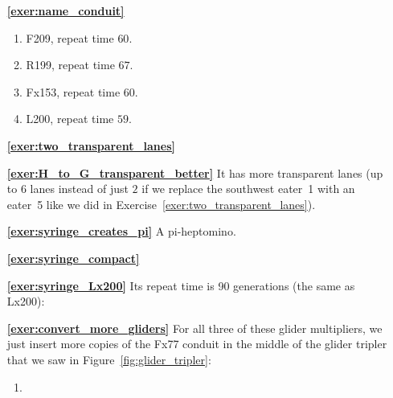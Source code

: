 \begin{multicols}{2}
	\begin{itemize}[leftmargin=0em]
		\item[\bf\color{ocre}\sffamily\ref{exer:name_conduit}] \begin{enumerate}[leftmargin=1.5em,label=\bf\color{ocre}(\alph*)]
			\item F209, repeat time $60$.
			
			\item R199, repeat time $67$.
			
			\item Fx153, repeat time $60$.
			
			\item L200, repeat time $59$.\\
		\end{enumerate}
		
		
		\item[\bf\color{ocre}\sffamily\ref{exer:two_transparent_lanes}]  \\
		
		
		\item[\bf\color{ocre}\sffamily\ref{exer:H_to_G_transparent_better}] It has more transparent lanes (up to $6$ lanes instead of just $2$ if we replace the southwest eater~1 with an eater~5 like we did in Exercise~\ref{exer:two_transparent_lanes}).\\
		
		
		\item[\bf\color{ocre}\sffamily\ref{exer:syringe_creates_pi}] A pi-heptomino. \\
		
		
		\item[\bf\color{ocre}\sffamily\ref{exer:syringe_compact}]  \\
		
		
		
		\item[\bf\color{ocre}\sffamily\ref{exer:syringe_Lx200}] Its repeat time is 90 generations (the same as Lx200):
		\begin{center}
		\end{center}
		
		
		\item[\bf\color{ocre}\sffamily\ref{exer:convert_more_gliders}] For all three of these glider multipliers, we just insert more copies of the Fx77 conduit in the middle of the glider tripler that we saw in Figure~\ref{fig:glider_tripler}:
		\begin{enumerate}[leftmargin=1.5em,label=\bf\color{ocre}(\alph*)]
			\item {} \\
			

\end{enumerate}
\end{itemize}
\end{multicols}
